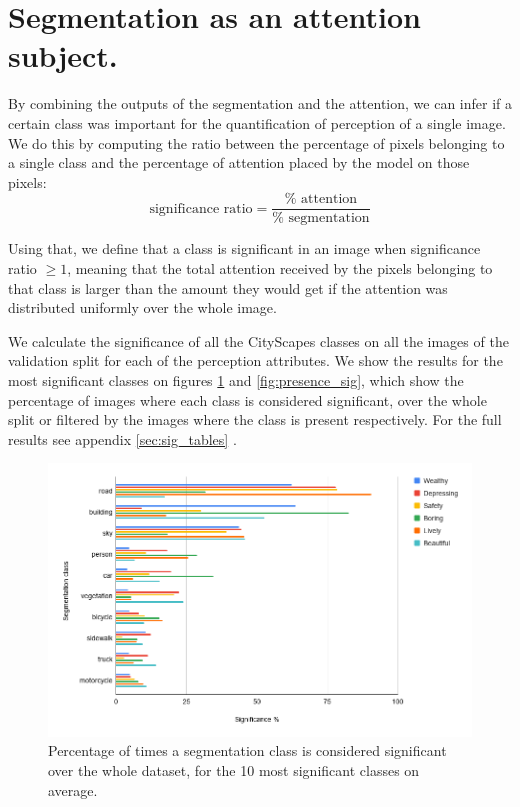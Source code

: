 \section{Segmentation as an attention subject.}
\label{sec:significance}

By combining the outputs of the segmentation and the attention, we can infer if a certain class was
important for the quantification of perception of a single image. We do this by computing the ratio between
the percentage of pixels belonging to a single class and the percentage of attention placed by the model on
those pixels:
\begin{equation}
	\text{significance ratio} = \frac{\% \text{ attention}}{ \% \text{ segmentation}}
\end{equation}

Using that, we define that a class is significant in an image when significance ratio $\geq 1$,
meaning that the total attention received by the pixels belonging to that class is larger
than the amount they would get if the attention was distributed uniformly over the whole image.

We calculate the significance of all the CityScapes classes
on all the images of the validation split for each of the perception attributes. We show
the results for the most significant classes on figures \ref{fig:total_sig} and \ref{fig:presence_sig}, which show the percentage
of images where each class is considered significant, over the whole split or filtered by the images
where the class is present respectively. For the full results see appendix \ref{sec:sig_tables} .

\begin{figure}[ht]
	\begin{center}
	\includegraphics[width=1\textwidth]{./figures/total_significance.png}
	\caption[Percentage of class significance when total]{
		Percentage of times a segmentation class is considered significant over the whole dataset, for the
		10 most significant classes on average.
        }
	\label{fig:total_sig}
	\end{center}
\end{figure}

